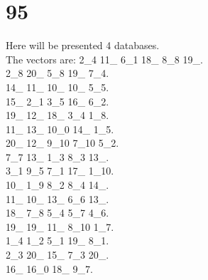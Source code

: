 \chapter{95}
\indent Here will be presented 4 databases.\\
The vectors are:
2\_4 11\_ 6\_1 18\_ 8\_8 19\_.\\2\_8 20\_ 5\_8 19\_ 7\_4.\\14\_ 11\_ 10\_ 10\_ 5\_5.\\15\_ 2\_1 3\_5 16\_ 6\_2.\\19\_ 12\_ 18\_ 3\_4 1\_8.\\11\_ 13\_ 10\_0 14\_ 1\_5.\\20\_ 12\_ 9\_10 7\_10 5\_2.\\7\_7 13\_ 1\_3 8\_3 13\_.\\3\_1 9\_5 7\_1 17\_ 1\_10.\\10\_ 1\_9 8\_2 8\_4 14\_.\\11\_ 10\_ 13\_ 6\_6 13\_.\\18\_ 7\_8 5\_4 5\_7 4\_6.\\19\_ 19\_ 11\_ 8\_10 1\_7.\\1\_4 1\_2 5\_1 19\_ 8\_1.\\2\_3 20\_ 15\_ 7\_3 20\_.\\16\_ 16\_0 18\_ 9\_7.\\